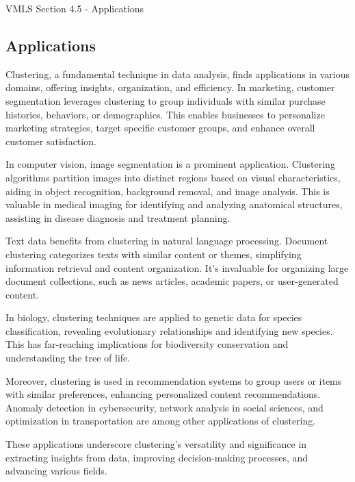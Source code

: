 \begin{notes}{VMLS Section 4.5 - Applications}
    \subsection*{Applications}

    Clustering, a fundamental technique in data analysis, finds applications in various domains, offering insights, organization, and efficiency. In marketing, customer segmentation leverages clustering to group individuals 
    with similar purchase histories, behaviors, or demographics. This enables businesses to personalize marketing strategies, target specific customer groups, and enhance overall customer satisfaction.

    In computer vision, image segmentation is a prominent application. Clustering algorithms partition images into distinct regions based on visual characteristics, aiding in object recognition, background removal, and image 
    analysis. This is valuable in medical imaging for identifying and analyzing anatomical structures, assisting in disease diagnosis and treatment planning.
    
    Text data benefits from clustering in natural language processing. Document clustering categorizes texts with similar content or themes, simplifying information retrieval and content organization. It's invaluable for 
    organizing large document collections, such as news articles, academic papers, or user-generated content.
    
    In biology, clustering techniques are applied to genetic data for species classification, revealing evolutionary relationships and identifying new species. This has far-reaching implications for biodiversity conservation 
    and understanding the tree of life.
    
    Moreover, clustering is used in recommendation systems to group users or items with similar preferences, enhancing personalized content recommendations. Anomaly detection in cybersecurity, network analysis in social sciences, 
    and optimization in transportation are among other applications of clustering.
    
    These applications underscore clustering's versatility and significance in extracting insights from data, improving decision-making processes, and advancing various fields.
\end{notes}